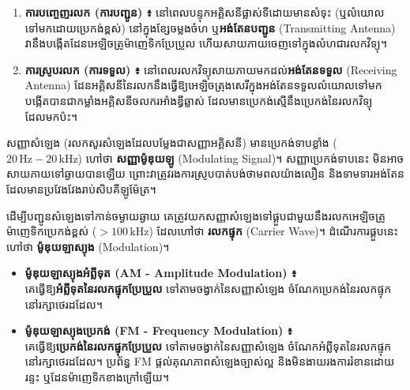 \noindent
\begin{enumerate}[label=\textbf{\arabic*.} ,itemsep=3pt, topsep=2pt, leftmargin=1.6em]
	\item \textbf{ការបញ្ចេញរលក (ការបញ្ជូន) ៖} នៅពេលបន្ទុកអគ្គិសនីផ្លាស់ទីដោយមានសំទុះ (ឬលំយោលទៅមកដោយប្រេកង់ខ្ពស់) នៅក្នុងខ្សែចម្លងចំហ ឬ\textbf{អង់តែនបញ្ជូន} ({\englishfont Transmitting Antenna}) វានឹងបង្កើតដែនអេឡិចត្រូម៉ាញេទិកប្រែប្រួល ហើយសាយភាយចេញទៅក្នុងលំហជារលកវិទ្យុ។
	\item \textbf{ការស្រូបរលក (ការទទួល) ៖} នៅពេលរលកវិទ្យុសាយភាយមកដល់\textbf{អង់តែនទទួល} ({\englishfont Receiving Antenna}) ដែនអគ្គិសនីនៃរលកនឹងធ្វើឱ្យអេឡិចត្រុងសេរីក្នុងអង់តែនទទួលលំយោលទៅមក បង្កើតបានជាកម្លាំងអគ្គិសនីចលករអាំងឌ្វីឆ្លាស់ ដែលមានប្រេកង់ស្មើនឹងប្រេកង់នៃរលកវិទ្យុដែលមកប៉ះ។
\end{enumerate}

\vspace{0.4em}
\noindent
{}

\noindent
សញ្ញាសំឡេង (រលកសូរសំឡេងដែលបម្លែងជាសញ្ញាអគ្គិសនី) មានប្រេកង់ទាបខ្លាំង ($20\,\text{Hz} - 20\,\text{kHz}$) ហៅថា \textbf{សញ្ញាម៉ូឌុយឡូ} ({\englishfont Modulating Signal})។ សញ្ញាប្រេកង់ទាបនេះ មិនអាចសាយភាយទៅឆ្ងាយបានឡើយ ព្រោះវាត្រូវរងការស្រូបបាត់បង់ថាមពលយ៉ាងលឿន និងទាមទារអង់តែនដែលមានប្រវែងវែងរាប់សិបគីឡូម៉ែត្រ។

\par\vspace{3pt}\noindent
ដើម្បីបញ្ជូនសំឡេងទៅកាន់ចម្ងាយឆ្ងាយ គេត្រូវយកសញ្ញាសំឡេងទៅផ្គួបជាមួយនឹងរលកអេឡិចត្រូម៉ាញេទិកប្រេកង់ខ្ពស់ ($> 100\,\text{kHz}$) ដែលហៅថា \textbf{រលកផ្ទុក} ({\englishfont Carrier Wave})។ ដំណើរការផ្គួបនេះហៅថា \textbf{ម៉ូឌុយឡាស្យុង} ({\englishfont Modulation})។

\begin{itemize}[itemsep=3pt, topsep=2pt, leftmargin=1.6em]
	\item \textbf{ម៉ូឌុយឡាស្យុងអំព្លីទុត (AM - {\englishfont Amplitude Modulation}) ៖}\\
	គេធ្វើឱ្យ\textbf{អំព្លីទុតនៃរលកផ្ទុកប្រែប្រួល} ទៅតាមចង្វាក់នៃសញ្ញាសំឡេង ចំណែកប្រេកង់នៃរលកផ្ទុកនៅរក្សាថេរដដែល។
	\item \textbf{ម៉ូឌុយឡាស្យុងប្រេកង់ (FM - {\englishfont Frequency Modulation}) ៖}\\
	គេធ្វើឱ្យ\textbf{ប្រេកង់នៃរលកផ្ទុកប្រែប្រួល} ទៅតាមចង្វាក់នៃសញ្ញាសំឡេង ចំណែកអំព្លីទុតនៃរលកផ្ទុកនៅរក្សាថេរដដែល។ ប្រព័ន្ធ FM ផ្ដល់គុណភាពសំឡេងច្បាស់ល្អ និងមិនងាយរងការរំខានដោយរន្ទះ ឬដែនម៉ាញេទិកខាងក្រៅឡើយ។
\end{itemize}


